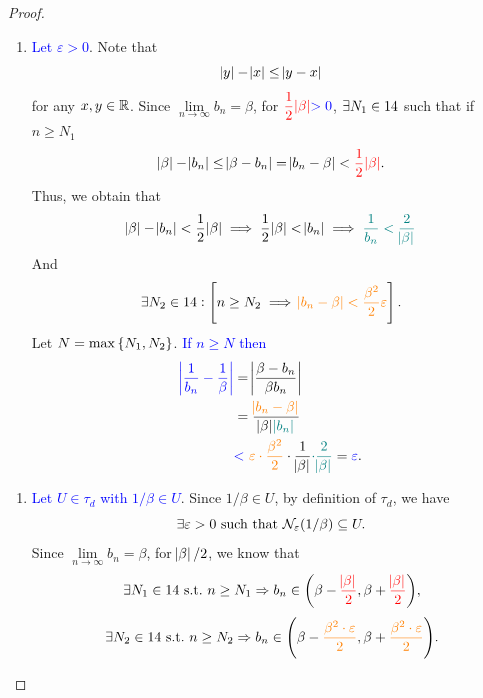 \documentclass[11pt,openany]{article}
\begin{document}
\begin{note}[]
\begin{proof}
\begin{flushleft}
\begin{minipage}[t]{0.495\textwidth}
\end{minipage}
\end{flushleft}
\newpage
\begin{flushleft}
\begin{minipage}[t]{0.475\textwidth}
\begin{enumerate}[(4)]
\item \textcolor{blue}{Let $\varepsilon>0$}. Note that \[
\abs{y}-\abs{x}\leq\abs{y-x}
\] for any $x,y\in\mathbb{R}$. Since $\lim\limits_{n\to\infty}b_n=\beta$, for $\displaystyle\textcolor{red}{\frac{1}{2}\abs{\beta}}\textcolor{blue}{>0}$, $\exists N_1\in14$ such that if $n\geq N_1$ \[
\abs{\beta}-\abs{b_n}\leq\abs{\beta-b_n}=\abs{b_n-\beta}<\textcolor{red}{\frac{1}{2}\abs{\beta}}.
\] Thus, we obtain that \[
\abs{\beta}-\abs{b_n}<\frac{1}{2}\abs{\beta}\implies\frac{1}{2}\abs{\beta}<\abs{b_n}\implies\textcolor{teal}{\frac{1}{b_n}<\frac{2}{\abs{\beta}}}
\] And \[
\exists N_2\in14:\left[n\geq N_2\implies\textcolor{orange}{\abs{b_n-\beta}<\frac{\beta^2}{2}\varepsilon}\right].
\] Let \textcolor{blue}{$N=\max\set{N_1,N_2}$}. \textcolor{blue}{If $n\geq N$ then} 
\begin{align*}
\textcolor{blue}{\abs{\frac{1}{b_n}-\frac{1}{\beta}}}&=\abs{\frac{\beta-b_n}{\beta b_n}}\\
&=\frac{\textcolor{orange}{\abs{b_n-\beta}}}{\abs{\beta}\textcolor{teal}{\abs{b_n}}}\\
&\textcolor{blue}{<}\ \textcolor{orange}{\varepsilon\cdot\frac{\beta^2}{2}}\cdot\frac{1}{\abs{\beta}}\textcolor{teal}{\cdot\frac{2}{\abs{\beta}}}=\textcolor{blue}{\varepsilon}.
\end{align*}
\end{enumerate}
\end{minipage}%
\hfill\vline
\begin{minipage}[t]{0.49\textwidth}
\begin{enumerate}[(4)]
\item \textcolor{blue}{Let $U\in\tau_d$ with $1/\beta\in U$}. Since $1/\beta\in U$, by definition of $\tau_d$, we have \[
\exists\varepsilon>0\ \text{such that}\ \mathcal{N}_{\varepsilon}(1/\beta)\subseteq U.
\] Since $\lim\limits_{n\to\infty}b_n=\beta$, for $\abs{\beta}/2$, we know that \[
\exists N_1\in\N\ \text{s.t.}\ n\geq N_1\Rightarrow b_n\in {\intoo{\beta-\textcolor{red}{\frac{\abs{\beta}}{2}},\beta+\textcolor{red}{\frac{\abs{\beta}}{2}}}},
\] \[
\exists N_2\in\N\ \text{s.t.}\ n\geq N_2\Rightarrow b_n\in {\intoo{\beta-\textcolor{orange}{\frac{\beta^2\cdot\varepsilon}{2}},\beta+\textcolor{orange}{\frac{\beta^2\cdot\varepsilon}{2}}}}.
\]
\end{enumerate}
\end{minipage}
\end{flushleft}
\end{proof}
\end{note}
\end{document}
